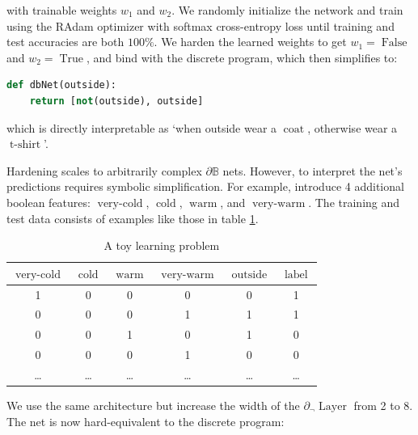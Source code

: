 \documentclass{article} %
\begin{document}
with trainable weights $w_{1}$ and $w_{2}$. We randomly initialize the network and train using the RAdam optimizer \citep{Liu2020On} with softmax cross-entropy loss until training and test accuracies are both $100\%$. We harden the learned weights to get $w_{1} = \operatorname{False}$ and $w_{2} = \operatorname{True}$, and bind with the discrete program, which then simplifies to:

\begin{lstlisting}[language=Python,style=mystyle,frame=single]
def dbNet(outside):
	return [not(outside), outside]
\end{lstlisting}

which is directly interpretable as `when outside wear a $\operatorname{coat}$, otherwise wear a $\operatorname{t-shirt}$'.

Hardening scales to arbitrarily complex $\partial\mathbb{B}$ nets. However, to interpret the net's predictions requires symbolic simplification. For example, introduce 4 additional boolean features: $\operatorname{very-cold}$, $\operatorname{cold}$, $\operatorname{warm}$, and $\operatorname{very-warm}$. The training and test data consists of examples like those in table \ref{tab:toy2}.

\begin{table}[h!]
	\centering
	\begin{tabular}{|c|c|c|c|c|c|}
		$\operatorname{very-cold}$ & $\operatorname{cold}$ & $\operatorname{warm}$ & $\operatorname{very-warm}$ & $\operatorname{outside}$ & $\operatorname{label}$ \\ \hline
		1 & 0 & 0 & 0 & 0 & 1 \\
		0 & 0 & 0 & 1 & 1 & 1 \\
		0 & 0 & 1 & 0 & 1 & 0 \\
		0 & 0 & 0 & 1 & 0 & 0 \\
		\dots & \dots & \dots & \dots & \dots & \dots
	\end{tabular}
	\caption{A toy learning problem}
	\label{tab:toy2}
\end{table}

We use the same architecture but increase the width of the $\partial_{\neg}\!\operatorname{Layer}$ from 2 to 8. The net is now hard-equivalent to the discrete program:
\end{document}
